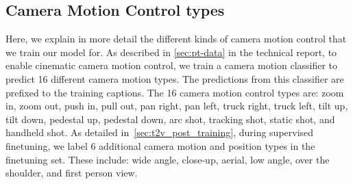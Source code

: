 \subsection{Camera Motion Control types} \label{appendix:data_camera_motion}
Here, we explain in more detail the different kinds of camera motion control that we train our model for.
As described in \cref{sec:pt-data} in the technical report, to enable cinematic camera motion control, we train a camera motion classifier to predict 16 different camera motion types. The predictions from this classifier are prefixed to the training captions.
The 16 camera motion control types are: zoom in, zoom out, push in, pull out, pan right, pan left, truck right, truck left, tilt up, tilt down, pedestal up, pedestal down, arc shot, tracking shot, static shot, and handheld shot.
As detailed in~\cref{sec:t2v_post_training}, during supervised finetuning, we label 6 additional camera motion and position types in the finetuning set.
These include: wide angle, close-up, aerial, low angle, over the shoulder, and first person view.
